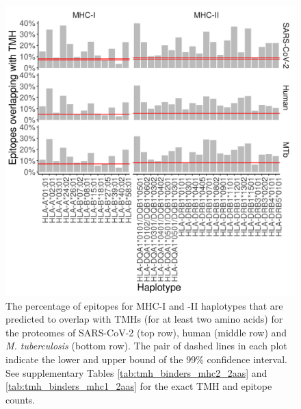 \begin{figure}[!htbp]
  \includegraphics[width=\textwidth]{bbbq_1_smart_2aa_results/fig_f_tmh_2_panel.png}
  \caption{
    The percentage of epitopes for MHC-I and -II haplotypes that are predicted to 
    overlap with TMHs (for at least two amino acids) 
    for the proteomes of SARS-CoV-2 (top row), human (middle 
    row) and \emph{M. tuberculosis} (bottom row).
    The pair of dashed lines in each plot indicate the lower and upper bound of the 99\% confidence interval.
    See supplementary Tables \ref{tab:tmh_binders_mhc2_2aas} and \ref{tab:tmh_binders_mhc1_2aas}
    for the exact TMH and  epitope counts.
  }
  \label{fig:bbbq_1_smart_results_2aas}
\end{figure}





\clearpage